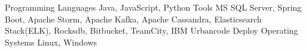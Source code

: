 \begin{cvskills}
    \cvskill
        {Programming Languages}
        {Java, JavaScript, Python}
    \cvskill
        {Tools}
        {MS SQL Server, Spring Boot, Apache Storm, Apache Kafka, Apache Cassandra, Elasticsearch Stack(ELK), Rocksdb, Bitbucket, TeamCity, IBM Urbancode Deploy}
    \cvskill
        {Operating Systems}
        {Linux, Windows}
\end{cvskills}
